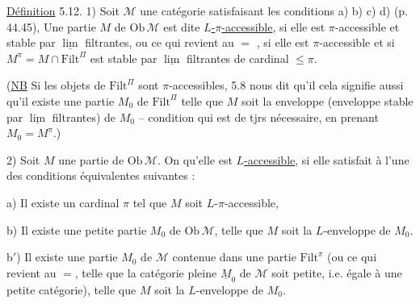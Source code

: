 
\uline{Définition} 5.12. 1) Soit $\mathcal M$ une catégorie satisfaisant les conditions a) b) c) d) (p. 44.\unsure{--|$=$}45),  Une partie $M$ de $\mathrm{Ob}\,\mathcal M$ est dite \uline{$L$-$\pi$-accessible}, si elle est $\pi$-accessible et stable par  $\underline{\lim}$ filtrantes\unsure{*}, ou ce qui revient au $=$ , si elle est $\pi$-accessible et si $M^\pi=M\cap\mathrm{Filt}^{\Pi}$ est stable par $\underline{\lim}$ filtrantes de cardinal $\leq\pi$.


(\uline{NB} Si les objets de $\mathrm{Filt}^{\Pi}$ sont $\pi$-accessibles, 5.8 nous dit qu'il cela signifie aussi qu'il  existe une partie $M_0$ de $\mathrm{Filt}^{\Pi}$ telle que $M$ soit la enveloppe (enveloppe stable par $\underline{\lim}$ filtrantes) de $M_0$ -- condition qui est de   tjrs nécessaire, en prenant $M_0=M^\pi$.)

2) Soit $M$ une partie de $\mathrm{Ob}\,\mathcal M$. On  qu'elle est \uline{$L$-accessible}, si elle satisfait à l'une des   conditions équivalentes suivantes :

a) Il existe un cardinal $\pi$ tel que $M$ soit $L$-$\pi$-accessible, 


b) Il existe une petite partie $M_0$ de $\mathrm{Ob}\,\mathcal M$, telle que $M$ soit la $L$-enveloppe de $M_0$.


b$'$) Il existe une partie $M_0$ de $\mathcal M$ contenue dans une partie $\mathrm{Filt}^{\pi}$ (ou ce qui revient au $=$, telle que la  catégorie pleine  $\underline M_0$ de $\mathcal M$ soit  petite, i.e. égale à une petite catégorie), telle que $M$ soit la $L$-enveloppe de $M_0$.

